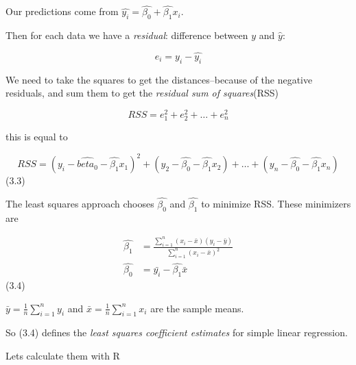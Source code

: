 \documentclass[
  letterpaper,
  DIV=11,
  numbers=noendperiod]{scrreprt}
\newenvironment{Shaded}{\begin{snugshade}}{\end{snugshade}}
\newcommand{\DecValTok}[1]{\textcolor[rgb]{0.47,0.16,0.63}{#1}}
\newcommand{\FunctionTok}[1]{\textcolor[rgb]{0.02,0.16,0.49}{#1}}
\newcommand{\NormalTok}[1]{\textcolor[rgb]{0.33,0.33,0.33}{#1}}
\newcommand{\OtherTok}[1]{\textcolor[rgb]{0.85,0.12,0.09}{#1}}
\newcommand{\SpecialCharTok}[1]{\textcolor[rgb]{0.00,0.46,0.62}{#1}}
\begin{document}
Our predictions come from
\(\hat{y_i} = \hat{\beta_0} + \hat{\beta_1}x_i\).

Then for each data we have a \emph{residual}: difference between \(y\)
and \(\hat{y}\):

\[
e_i = y_i - \hat{y_i}
\]

We need to take the squares to get the distances--because of the
negative residuals, and sum them to get the \emph{residual sum of
squares}(RSS)

\[
RSS = e_1^2 + e_2^2 + \dots + e_n^2
\]

this is equal to

\[
RSS = (y_i - \hat{beta_0} - \hat{\beta_1}x_1)^2 + (y_2 - \hat{\beta_0} - \hat{\beta_1}x_2) + \dots + (y_n - \hat{\beta_0} - \hat{\beta_1}x_n)
\] (3.3)

The least squares approach chooses \(\hat{\beta_0}\) and
\(\hat{\beta_1}\) to minimize RSS. These minimizers are

\[
\begin{align}
\hat{\beta_1} &= \frac{\sum_{i=1}^n(x_i - \bar{x})(y_i - \bar{y})}{\sum_{i=1}^n(x_i - \bar{x})^2} \\
\hat{\beta_0} &= \bar{y_i} - \hat{\beta_1}\bar{x}
\end{align}
\] (3.4)

\(\bar{y} = \frac{1}{n}\sum_{i=1}^ny_i\) and
\(\bar{x} = \frac{1}{n}\sum_{i=1}^nx_i\) are the sample means.

So (3.4) defines the \emph{least squares coefficient estimates} for
simple linear regression.

Lets calculate them with R

\begin{Shaded}
\end{Shaded}
\end{document}
